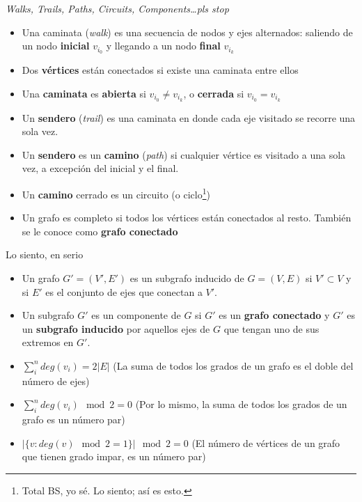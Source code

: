 \documentclass[spanish, c]{beamer}
\begin{document}
\begin{frame}{\textit{Walks, Trails, Paths, Circuits, Components\dots}}{\textit{pls stop}}

    \begin{itemize}[<+->]
        \item Una \alert{caminata} (\textit{walk}) es una secuencia de nodos y ejes alternados: saliendo de un nodo \textbf{inicial} $v_{i_0}$ y llegando a un nodo \textbf{final} $v_{i_k}$
        \item Dos \textbf{vértices} están \alert{conectados} si existe una \alert{caminata} entre ellos
        \item Una \textbf{caminata} es \textbf{abierta} si $v_{i_0} \neq v_{i_k}$, o \textbf{cerrada} si $v_{i_0} = v_{i_k}$
        \item Un \textbf{sendero} (\textit{trail}) es una caminata en donde cada eje visitado se recorre una sola vez.
        \item Un \textbf{sendero} es un \textbf{camino} (\textit{path}) si cualquier vértice es visitado a una sola vez, a excepción del inicial y el final.
        \item Un \textbf{camino} cerrado es un \alert{circuito} (o ciclo\footnote{Total BS, yo sé. Lo siento; así es esto.})
        \item Un grafo es \alert{completo} si todos los vértices están conectados al resto. También se le conoce como \textbf{grafo conectado}
    \end{itemize}
\end{frame}

\begin{frame}{Lo siento, en serio}

    \begin{itemize}[<+->]
        \item Un grafo $G'=(V',E')$ es un \alert{subgrafo inducido} de $G = (V ,E)$ si $V' \subset V$ y si $E'$ es el conjunto de ejes que conectan a $V'$.
        \item Un subgrafo $G'$ es un \alert{componente} de $G$ si $G'$ es un \textbf{grafo conectado} y $G'$ es un \textbf{subgrafo inducido} por aquellos ejes de $G$ que tengan uno de sus extremos en $G'$.
        \item $\sum_i^n deg(v_i) = 2\vert E\vert$ (La suma de todos los grados de un grafo es el doble del número de ejes)
        \item $\sum_i^n deg(v_i) \mod 2 = 0$ (Por lo mismo, la suma de todos los grados de un grafo es un número par)
        \item $\lvert\{v : deg(v) \mod 2 = 1\}\rvert \mod 2 = 0$ (El número de vértices de un grafo que tienen grado impar, es un número par)
    \end{itemize}

\end{frame}
\end{document}
